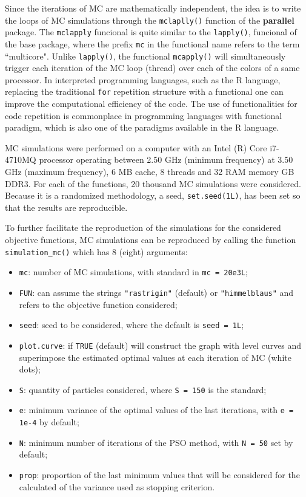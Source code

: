 \documentclass[10pt,letterpaper]{article}
\begin{document}
Since the iterations of MC are mathematically independent, the idea is to write the loops of MC simulations through the \texttt{mclaplly()} function of the \textbf{parallel} package. The \texttt{mclapply} funcional is quite similar to the \texttt{lapply()}, funcional of the base package, where the prefix \texttt{mc} in the functional name refers to the term ``multicore". Unlike \texttt{lapply()}, the functional \texttt{mcapply()} will simultaneously trigger each iteration of the MC loop (thread) over each of the colors of a same processor. In interpreted programming languages, such as the \textsc{R} language, replacing the traditional \texttt{for} repetition structure with a functional one can improve the computational efficiency of the code. The use of functionalities for code repetition is commonplace in programming languages with functional paradigm, which is also one of the paradigms available in the \textsc{R} language.

MC simulations were performed on a computer with an Intel (R) Core i7-4710MQ processor operating between 2.50 GHz (minimum frequency) at 3.50 GHz (maximum frequency), 6 MB cache, 8 threads and 32 RAM memory GB DDR3. For each of the functions, 20 thousand MC simulations were considered. Because it is a randomized methodology, a seed, \texttt{set.seed(1L)}, has been set so that the results are reproducible. 

To further facilitate the reproduction of the simulations for the considered objective functions, MC simulations can be reproduced by calling the function \texttt{simulation\_mc()} which has 8 (eight) arguments:
\begin{itemize}
	\item \texttt{mc}: number of MC simulations, with standard in \texttt{mc = 20e3L};
	\item \texttt{FUN}: can assume the strings \texttt{"rastrigin"} (default) or \texttt{"himmelblaus"} and refers to the objective function considered;
	\item \texttt{seed}: seed to be considered, where the default is \texttt{seed = 1L};
	\item \texttt{plot.curve}: if \texttt{TRUE} (default) will construct the graph with level curves and superimpose the estimated optimal values at each iteration of MC (white dots);
	\item \texttt{S}: quantity of particles considered, where \texttt{S = 150} is the standard;
	\item \texttt{e}: minimum variance of the optimal values of the last iterations, with \texttt{e = 1e-4} by default;
	\item \texttt{N}: minimum number of iterations of the PSO method, with \texttt{N = 50} set by default;
	\item \texttt{prop}: proportion of the last minimum values that will be considered for the calculated of the variance used as stopping criterion.
\end{itemize} 
\end{document}
